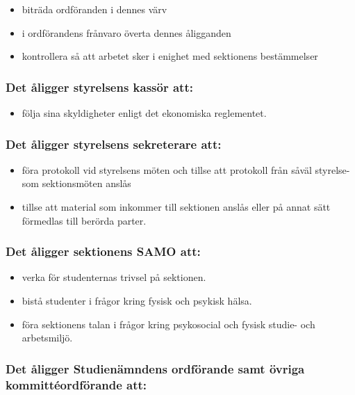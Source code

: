 \begin{itemize}
  \item biträda ordföranden i dennes värv 
  \item i ordförandens frånvaro överta dennes åligganden 
  \item kontrollera så att arbetet sker i enighet med sektionens bestämmelser 
\end{itemize}

\subsubsection{Det åligger styrelsens kassör att:}

\begin{itemize}
  \item följa sina skyldigheter enligt det ekonomiska reglementet. 
\end{itemize}

\subsubsection{Det åligger styrelsens sekreterare att:}

\begin{itemize}
  \item föra protokoll vid styrelsens möten och tillse att protokoll från såväl styrelse- som sektionsmöten anslås
  \item tillse att material som inkommer till sektionen anslås eller på annat sätt förmedlas till berörda parter.
\end{itemize}

\subsubsection{Det åligger sektionens SAMO att:}

\begin{itemize}
    \item verka för studenternas trivsel på sektionen.
    \item bistå studenter i frågor kring fysisk och psykisk hälsa.
    \item föra sektionens talan i frågor kring psykosocial och fysisk studie- och arbetsmiljö.
\end{itemize}

\subsubsection{Det åligger Studienämndens ordförande samt övriga kommittéordförande att:}

